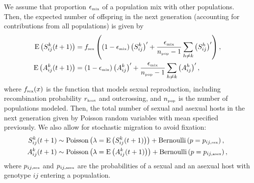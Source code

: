 \documentclass{article}\usepackage[]{graphicx}\usepackage[]{color}
\begin{document}
We assume that proportion $\epsilon_{\textrm{\tiny mix}}$ of a population mix with other populations.
Then, the expected number of offspring in the next generation (accounting for contributions from all populations) is given by
\begin{equation}
\begin{aligned}
\mathrm{E}\left(S_{ij}^k(t+1)\right) &= f_{\textrm{\tiny sex}}\left((1 - \epsilon_{\textrm{\tiny mix}}) \left(S_{ij}^k\right)' + \frac{\epsilon_{\textrm{\tiny mix}}}{n_{\textrm{\tiny pop}}-1} \sum_{h \neq k} \left(S_{ij}^h\right)'\right),\\
\mathrm{E}\left(A_{ij}^k(t+1)\right) &= (1 - \epsilon_{\textrm{\tiny mix}}) \left(A_{ij}^k\right)' + \frac{\epsilon_{\textrm{\tiny mix}}}{n_{\textrm{\tiny pop}}-1} \sum_{h \neq k} \left(A_{ij}^h\right)',\\
\end{aligned}
\end{equation}
where $f_{\textrm{\tiny sex}}(x)$ is the function that models sexual reproduction, including recombination probability $r_{\textrm{\tiny host}}$ and outcrossing, and $n_{\textrm{\tiny pop}}$ is the number of populations modeled.
Then, the total number of sexual and asexual hosts in the next generation given by Poisson random variables with mean specified previously. We also allow for stochastic migration to avoid fixation:
\begin{equation}
\begin{aligned}
S_{ij}^k(t+1) &\sim \mathrm{Poisson}\left(\lambda=\mathrm{E}\left(S_{ij}^k(t+1)\right)\right) + \mathrm{Bernoulli}\left(p=p_{ij,\textrm{\tiny sex}}\right),\\
A_{ij}^k(t+1) &\sim \mathrm{Poisson}\left(\lambda=\mathrm{E}\left(A_{ij}^k(t+1)\right)\right) + \mathrm{Bernoulli}\left(p=p_{ij, \textrm{\tiny asex}}\right),
\end{aligned}
\end{equation}
where $p_{ij,\textrm{\tiny sex}}$ and $p_{ij, \textrm{\tiny asex}}$ are the probabilities of a sexual and an asexual host with genotype $ij$ entering a popualation.
\end{document}
